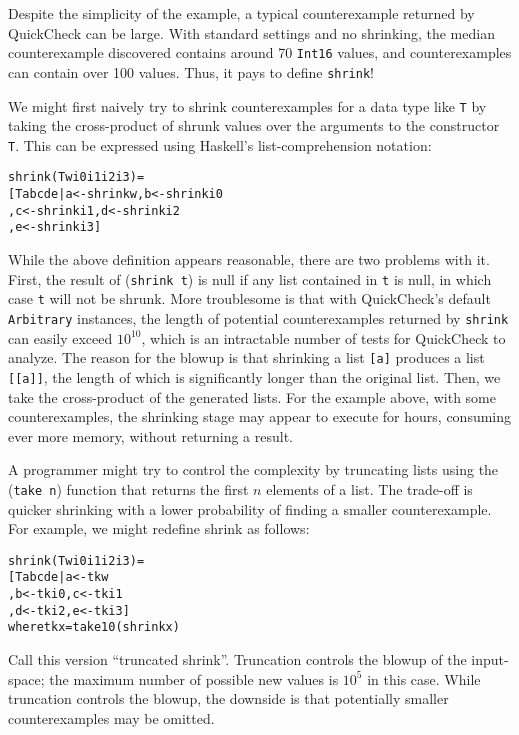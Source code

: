 \documentclass{sigplanconf}
\newenvironment{code}{\begin{alltt}\footnotesize}{\end{alltt}}
\newcommand{\ttp}[1]{\texttt{#1}}
\begin{document}
Despite the simplicity of the example, a typical counterexample returned by
QuickCheck can be large.  With standard settings and no shrinking, the median
counterexample discovered contains around 70 \ttp{Int16} values, and
counterexamples can contain over 100 values.   Thus, it pays to
define \ttp{shrink}!

We might first naively try to shrink counterexamples for a data type like
\ttp{T} by taking the cross-product of shrunk values over the arguments to the
constructor \ttp{T}.  This can be expressed using Haskell's list-comprehension
notation:
%
\begin{code}
shrink (T w i0 i1 i2 i3) =
  [ T a b c d e | a <- shrink w,  b <- shrink i0
                , c <- shrink i1, d <- shrink i2
                , e <- shrink i3 ]
\end{code}
%
\noindent
While the above definition appears reasonable, there are two problems with it.
First, the result of (\ttp{shrink t}) is null if any list contained in \ttp{t}
is null, in which case \ttp{t} will not be shrunk.  More troublesome is that with
QuickCheck's default \ttp{Arbitrary} instances, the length of potential
counterexamples returned by \ttp{shrink} can easily exceed $10^{10}$, which is
an intractable number of tests for QuickCheck to analyze.  The reason for the
blowup is that shrinking a list \ttp{[a]} produces a list \ttp{[[a]]}, the
length of which is significantly longer than the original list.  Then, we take
the cross-product of the generated lists.  For the example above, with some
counterexamples, the shrinking stage may appear to execute for hours, consuming
ever more memory, without returning a result.

A programmer might try to control the complexity by truncating lists using the
(\ttp{take n}) function that returns the first $n$ elements of a list.  The
trade-off is quicker shrinking with a lower probability of finding a smaller
counterexample.  For example, we might redefine shrink as follows:
%
\begin{samepage}
\begin{code}
shrink (T w i0 i1 i2 i3) =
  [ T a b c d e | a <- tk w
                , b <- tk i0, c <- tk i1
                , d <- tk i2, e <- tk i3 ]
  where tk x = take 10 (shrink x)
\end{code}
\end{samepage}
%
\noindent
Call this version ``truncated shrink''.  Truncation controls the blowup of the
input-space; the maximum number of possible new values is $10^5$ in this case.
While truncation controls the blowup, the downside is that potentially smaller
counterexamples may be omitted.
\end{document}
